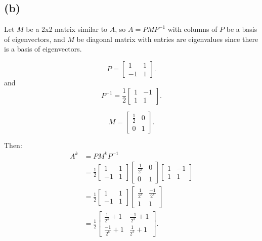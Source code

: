 \documentclass[10pt]{article}
\begin{document}
\subsection*{(b)}
\noindent Let $M$ be a 2x2 matrix similar to $A$, so $A = PMP^{-1}$ with columns of $P$ be a basis of eigenvectors, and $M$ be diagonal matrix with entries are eigenvalues since there is a basis of eigenvectors. \par
\begin{equation*}
    P = \begin{bmatrix}
        1 & 1 \\
        -1 & 1
    \end{bmatrix}.
\end{equation*}
and 
\begin{equation*}
    P^{-1} = \frac{1}{2}
    \begin{bmatrix}
        1 & -1 \\
        1 & 1
    \end{bmatrix}.
\end{equation*}

\begin{equation*}
    M = \begin{bmatrix}
        \frac{1}{2} & 0 \\
        0 & 1
    \end{bmatrix}.
\end{equation*}

\noindent Then:
\begin{align*}
    A^k &= PM^kP^{-1} \\
    &= \frac{1}{2}
    \begin{bmatrix}
        1 & 1 \\
        -1 & 1
    \end{bmatrix}
    \begin{bmatrix}
        \frac{1}{2^k} & 0 \\
        0 & 1
    \end{bmatrix}
    \begin{bmatrix}
        1 & -1 \\
        1 & 1
    \end{bmatrix} \\
    &= \frac{1}{2}
    \begin{bmatrix}
        1 & 1 \\
        -1 & 1
    \end{bmatrix}
    \begin{bmatrix}
        \frac{1}{2^k} & \frac{-1}{2^k} \\
        1 & 1
    \end{bmatrix} \\
    &= \frac{1}{2}
    \begin{bmatrix}
        \frac{1}{2^k}+1 & \frac{-1}{2^k}+1 \\
        \frac{-1}{2^k}+1 & \frac{1}{2^k}+1
    \end{bmatrix}.
\end{align*}
\end{document}
